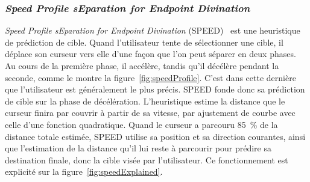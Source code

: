 		
	\subsubsection{\emph{Speed Profile sEparation for Endpoint Divination}}
	\emph{Speed Profile sEparation for Endpoint Divination} (SPEED)~\cite{wonner2011speed} est une heuristique de prédiction de cible. Quand l'utilisateur tente de sélectionner une cible, il déplace son curseur vers elle d'une façon que l'on peut séparer en deux phases. Au cours de la première phase, il accélère, tandis qu'il décélère pendant la seconde, comme le montre la figure~\ref{fig:speedProfile}. C'est dans cette dernière que l'utilisateur est généralement le plus précis. SPEED fonde donc sa prédiction de cible sur la phase de décélération. L'heuristique estime la distance que le curseur finira par couvrir à partir de sa vitesse, par ajustement de courbe avec celle d'une fonction quadratique. Quand le curseur a parcouru 85~\%{} de la distance totale estimée, SPEED utilise sa position et sa direction courantes, ainsi que l'estimation de la distance qu'il lui reste à parcourir pour prédire sa destination finale, donc la cible visée par l'utilisateur. Ce fonctionnement est explicité sur la figure~\ref{fig:speedExplained}.
	
